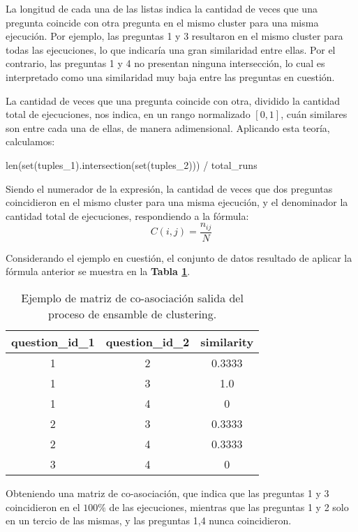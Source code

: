 La longitud de cada una de las listas indica la cantidad de veces que una pregunta coincide con otra pregunta en el mismo cluster para una misma ejecución. Por ejemplo, las preguntas 1 y 3 resultaron en el mismo cluster para todas las ejecuciones, lo que indicaría una gran similaridad entre ellas. Por el contrario, las preguntas 1 y 4 no presentan ninguna intersección, lo cual es interpretado como una similaridad muy baja entre las preguntas en cuestión.

\bigskip La cantidad de veces que una pregunta coincide con otra, dividido la cantidad total de ejecuciones, nos indica, en un rango normalizado \([0,1]\), cuán similares son entre cada una de ellas, de manera adimensional. Aplicando esta teoría, calculamos:

\begin{python}
len(set(tuples_1).intersection(set(tuples_2))) / total_runs
\end{python}

Siendo el numerador de la expresión, la cantidad de veces que dos preguntas coincidieron en el mismo cluster para una misma ejecución, y el denominador la cantidad total de ejecuciones, respondiendo a la fórmula:
\[C(i,j)=\frac{n_{ij}}{N}\]

\bigskip Considerando el ejemplo en cuestión, el conjunto de datos resultado de aplicar la fórmula anterior se muestra en la \textbf{Tabla \ref{tab:coasociacion}}.
\begin{table}[]
	\centering
	\begin{tabular}{|c|c|c|}
		\hline
		\textbf{question\_id\_1} & \textbf{question\_id\_2} & \textbf{similarity} \\ \hline
		1                        & 2                        & 0.3333              \\ \hline
		1                        & 3                        & 1.0                 \\ \hline
		1                        & 4                        & 0                   \\ \hline
		2                        & 3                        & 0.3333              \\ \hline
		2                        & 4                        & 0.3333              \\ \hline
		3                        & 4                        & 0                   \\ \hline
	\end{tabular}
	\caption{Ejemplo de matriz de co-asociación salida del proceso de ensamble de clustering.}
	\label{tab:coasociacion}
\end{table}
Obteniendo una matriz de co-asociación, que indica que las preguntas 1 y 3 coincidieron en el \(100\%\) de las ejecuciones, mientras que las preguntas 1 y 2 solo en un tercio de las mismas, y las preguntas 1,4 nunca coincidieron.
